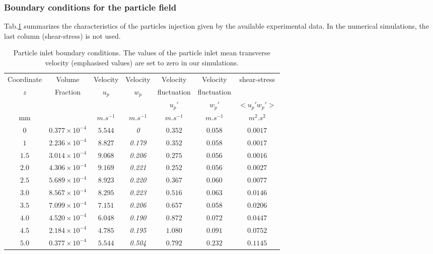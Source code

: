 \newpage
\subsubsection{Boundary conditions for the particle field}

Tab.\ref{CL_part} summarizes the characteristics of the particles injection given by the available experimental data. In the numerical simulations, the last column (shear-stress) is not used.


\begin{table}[H]
\begin{center}
\begin{tabular}{|c|c|c|c|c|c|c|} \hline
Coordinate  & Volume    & Velocity  & Velocity  & Velocity   & Velocity & shear-stress \\
   $z$      & Fraction  &  $u_p$   &   $w_p$  &  fluctuation  & fluctuation  &   \\
            &          &          &          &   ${u_p}'$  &  ${w_p}'$   & $<{u_p}'{w_p}'>$ \\
\hline
        mm  &           &  $m.s^{-1}$ &  $m.s^{-1}$  & $m.s^{-1}$  &  $m.s^{-1}$   & $m^{2}.s^{2}$\\   \hline
     $0   $ & $0.377 \times 10^{-4}$ & $5.544$ & {\em 0  }   & $0.352$ & $0.058 $ & $ 0.0017$\\   \hline
     $1   $ & $2.236 \times 10^{-4}$ & $8.827$ & {\em 0.179} & $0.352$ & $0.058 $ & $ 0.0017$\\   \hline
     $1.5 $ & $3.014 \times 10^{-4}$ & $9.068$ & {\em 0.206} & $0.275$ & $0.056 $ & $ 0.0016$\\   \hline
     $2.0 $ & $4.306 \times 10^{-4}$ & $9.169$ &{\em 0.221} & $0.252$ & $0.056 $ & $ 0.0027$\\   \hline
     $2.5 $ & $5.689 \times 10^{-4}$ & $8.923$ &{\em 0.220} & $0.367$ & $0.060 $ & $ 0.0077$\\   \hline
     $3.0 $ & $8.567 \times 10^{-4}$ & $8.295$ &{\em 0.223} & $0.516$ & $0.063 $ & $ 0.0146$\\   \hline
     $3.5 $ & $7.099 \times 10^{-4}$ & $7.151$ &{\em 0.206} & $0.657$ & $0.058 $ & $ 0.0206$\\   \hline
     $4.0 $ & $4.520 \times 10^{-4}$ & $6.048$ &{\em 0.190} & $0.872$ & $0.072 $ & $ 0.0447$\\   \hline
     $4.5 $ & $2.184 \times 10^{-4}$ & $4.785$ & {\em 0.195} & $1.080$ & $0.091 $ & $ 0.0752$\\   \hline
     $5.0 $ & $0.377 \times 10^{-4}$ & $5.544$ & {\em 0.504} & $0.792$ & $0.232 $ & $ 0.1145$\\   \hline
\end{tabular}
\end{center}
\caption{Particle inlet boundary conditions. The values of the particle inlet mean transverse velocity (emphasised values) are set to zero in our simulations.}
\label{CL_part}
\end{table}

